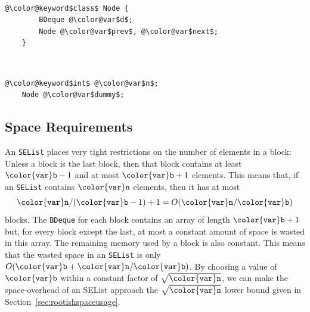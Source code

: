 \documentclass[10pt]{book}
\newcommand{\secref}[1]{Section~\ref{sec:#1}}
\theoremstyle{plain}
\theoremstyle{definition}
\begin{document}


 \ \vspace{.5ex}\begin{Verbatim}[gobble=1,tabsize=2,frame=single,framerule=1.2pt,commandchars=\\@\$,label=\texttt{SEList},labelposition=topline]
	@\color@keyword$class$ Node {
		BDeque @\color@var$d$;
		Node @\color@var$prev$, @\color@var$next$;
	}
\end{Verbatim}



 \ \vspace{.5ex}\begin{Verbatim}[gobble=1,tabsize=2,frame=single,framerule=1.2pt,commandchars=\\@\$,label=\texttt{SEList},labelposition=topline]
	@\color@keyword$int$ @\color@var$n$;
	Node @\color@var$dummy$;
\end{Verbatim}



\subsection{Space Requirements}

An \texttt{SEList} places very tight restrictions on the number of elements
in a block: Unless a block is the last block, then that block contains
at least $\ensuremath{\mathtt{{\color{var}b}}}-1$ and at most $\ensuremath{\mathtt{{\color{var}b}}}+1$ elements.  This means that, if an
\texttt{SEList} contains \ensuremath{\mathtt{{\color{var}n}}} elements, then it has at most
\[
    \ensuremath{\mathtt{{\color{var}n}}}/(\ensuremath{\mathtt{{\color{var}b}}}-1) + 1 = O(\ensuremath{\mathtt{{\color{var}n}}}/\ensuremath{\mathtt{{\color{var}b}}})
\]
blocks.  The \texttt{BDeque} for each block contains an array of length $\ensuremath{\mathtt{{\color{var}b}}}+1$
but, for every block except the last, at most a constant amount of
space is wasted in this array.  The remaining memory used by a block is
also constant.  This means that the wasted space in an \texttt{SEList} is only
$O(\ensuremath{\mathtt{{\color{var}b}}}+\ensuremath{\mathtt{{\color{var}n}}}/\ensuremath{\mathtt{{\color{var}b}}})$.  By choosing a value of \ensuremath{\mathtt{{\color{var}b}}} within a constant factor
of $\sqrt{\ensuremath{\mathtt{{\color{var}n}}}}$, we can make the space-overhead of an SEList approach
the $\sqrt{\ensuremath{\mathtt{{\color{var}n}}}}$ lower bound given in \secref{rootishspaceusage}.
\end{document}
